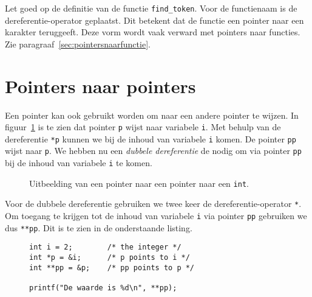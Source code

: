 Let goed op de definitie van de functie \texttt{find\_token}. Voor de functienaam is de dereferentie-operator geplaatst. Dit betekent dat de functie een pointer naar een karakter teruggeeft. Deze vorm wordt vaak verward met pointers naar functies. Zie paragraaf~\ref{sec:pointersnaarfunctie}.


\section{Pointers naar pointers}
\label{sec:pointersnaarpointers}
Een pointer kan ook gebruikt worden om naar een andere pointer te wijzen. In figuur~\ref{fig:poipointertopointer} is te zien dat pointer \texttt{p} wijst naar variabele \texttt{i}. Met behulp van de dereferentie \texttt{*p} kunnen we bij de inhoud van variabele \texttt{i} komen. De pointer \texttt{pp} wijst naar \texttt{p}. We hebben nu een \textsl{dubbele dereferentie} de nodig om via pointer \texttt{pp} bij de inhoud van variabele \texttt{i} te komen. 

\begin{figure}[!ht]
\centering
{}
\caption{Uitbeelding van een pointer naar een pointer naar een \texttt{int}.}
\label{fig:poipointertopointer}
\end{figure}

Voor de dubbele dereferentie gebruiken we twee keer de dereferentie-operator \texttt{*}. Om toegang te krijgen tot de inhoud van variabele \texttt{i} via pointer \texttt{pp} gebruiken we dus \texttt{**pp}. Dit is te zien in de onderstaande listing.

\begin{figure}[!ht]
\begin{lstlisting}[caption=Voorbeeld van een pointer naar een pointer.]
int i = 2;        /* the integer */
int *p = &i;      /* p points to i */
int **pp = &p;    /* pp points to p */

printf("De waarde is %d\n", **pp);
\end{lstlisting}
\end{figure}

